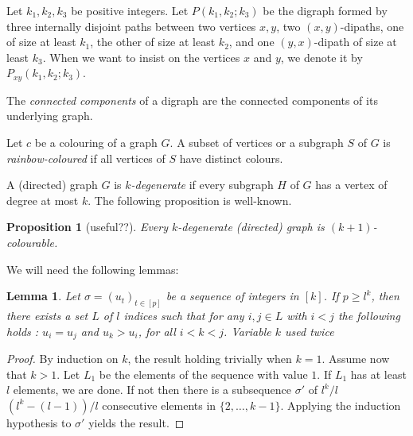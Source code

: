 \documentclass[utf8,10pt]{article}
\theoremstyle{plain}
\newtheorem{lemma}[theorem]{Lemma}
\newtheorem{proposition}[theorem]{Proposition}
\theoremstyle{definition}
\theoremstyle{remark}
\newcommand{\nathann}[1]{{\color{blue}{\bf Nathann:} #1}}
\begin{document}
Let $k_1,k_2,k_3$ be positive integers. Let $P(k_1,k_2;k_3)$ be the digraph formed by three internally disjoint paths between two vertices $x,y$, two $(x,y)$-dipaths, one of size at least $k_1$, the other of size at least $k_2$, and one $(y,x)$-dipath of size at least $k_3$.
When we want to insist on the vertices $x$ and $y$, we denote it by $P_{xy}(k_1,k_2;k_3)$.


The {\it connected components} of a digraph are the connected components of its underlying graph.

Let $c$ be a colouring of a graph $G$. A subset of vertices or a subgraph $S$ of $G$ is {\it rainbow-coloured} if all vertices of $S$ have distinct colours.


A (directed) graph $G$ is {\it $k$-degenerate} if every subgraph $H$ of $G$ has a vertex of degree at most $k$.
The following proposition is well-known.
\begin{proposition}[useful??]\label{prop:deg}
Every $k$-degenerate (directed) graph is $(k+1)$-colourable.
\end{proposition}





We will need the following lemmas:

%
%

\begin{lemma}\label{min}
Let $\sigma=(u_t)_{t\in [p]}$ be a sequence of integers in $[k]$. If $p\geq l^k$, then there exists a set $L$ of $l$ indices such that for any $i,j \in L$ with $i < j$ the following holds : $u_i=u_j$ and $u_k > u_i$, for all $i < k < j$. \nathann{Variable $k$ used twice}
\end{lemma}

\begin{proof}
By induction on $k$, the result holding trivially when $k=1$. Assume now that $k>1$. Let $L_1$ be the elements of the sequence with value $1$. If $L_1$ has at least $l$ elements, we are done.
If not then there is a subsequence $\sigma'$ of $l^k/l$ \nathann{$(l^k-(l-1))/l$} consecutive elements in $\{2, \dots , k-1\}$. Applying the induction hypothesis to $\sigma'$ yields the result.
\end{proof}
\end{document}

